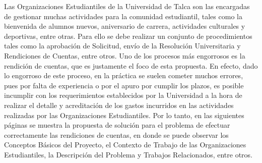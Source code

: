 Las Organizaciones Estudiantiles de la Universidad de Talca son las encargadas de gestionar muchas actividades para la comunidad estudiantil, tales como la bienvenida de alumnos nuevos, aniversario de carrera, actividades culturales y deportivas, entre otras. Para ello se debe realizar un conjunto de procedimientos tales como la aprobación de Solicitud, envío de la Resolución Universitaria y Rendiciones de Cuentas, entre otros. Uno de los procesos más engorrosos es la rendición de cuentas, que es justamente el foco de esta propuesta. En efecto, dado lo engorroso de este proceso, en la práctica se suelen cometer muchos errores, pues por falta de experiencia o por el apuro por cumplir los plazos, es posible incumplir con los requerimientos establecidos por la Universidad a la hora de realizar el detalle y acreditación de los gastos incurridos en las actividades realizadas por las Organizaciones Estudiantiles. Por lo tanto, en las siguientes páginas se muestra la propuesta de solución para el problema de efectuar correctamente las rendiciones de cuentas, en donde se puede observar los Conceptos Básicos del Proyecto, el Contexto de Trabajo de las Organizaciones Estudiantiles, la Descripción del Problema y Trabajos Relacionados, entre otros.